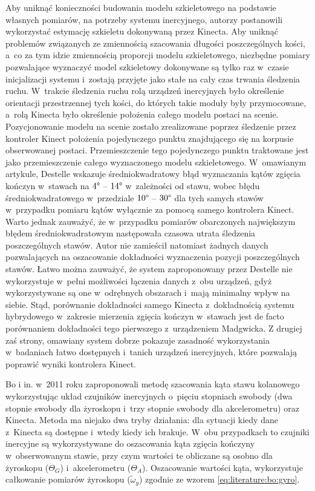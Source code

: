 Aby uniknąć konieczności budowania modelu szkieletowego na podstawie własnych pomiarów, na potrzeby systemu inercyjnego, autorzy postanowili wykorzystać estymację szkieletu dokonywaną przez Kinecta. Aby uniknąć problemów związanych ze zmiennością szacowania długości poszczególnych kości, a~co za tym idzie zmiennością proporcji modelu szkieletowego, niezbędne pomiary pozwalające wyznaczyć model szkieletowy dokonywane są tylko raz w~czasie inicjalizacji systemu i~zostają przyjęte jako stałe na cały czas trwania śledzenia ruchu. W~trakcie śledzenia ruchu rolą urządzeń inercyjnych było określenie orientacji przestrzennej tych kości, do których takie moduły były przymocowane, a~rolą Kinecta było określenie położenia całego modelu postaci na scenie. Pozycjonowanie modelu na scenie zostało zrealizowane poprzez śledzenie przez kontroler Kinect położenia pojedynczego punktu znajdującego się na korpusie obserwowanej postaci. Przemieszczenie tego pojedynczego punktu traktowane jest jako przemieszczenie całego wyznaczonego modelu szkieletowego. W~omawianym artykule, Destelle wskazuje średniokwadratowy błąd wyznaczania kątów zgięcia kończyn w~stawach na $4\degree$ -- $14\degree$ w~zależności od stawu, wobec błędu średniokwadratowego w~przedziale $10\degree$ -- $30\degree$ dla tych samych stawów w~przypadku pomiaru kątów wyłącznie za pomocą samego kontrolera Kinect. Warto jednak zauważyć, że w~przypadku pomiarów obarczonych największym błędem średniokwadratowym następowała czasowa utrata śledzenia poszczególnych stawów. Autor nie zamieścił natomiast żadnych danych pozwalających na oszacowanie dokładności wyznaczenia pozycji poszczególnych stawów. Łatwo można zauważyć, że system zaproponowany przez Destelle nie wykorzystuje w~pełni możliwości łączenia danych z~obu urządzeń, gdyż wykorzystywane są one w~odrębnych obszarach i~mają minimalny wpływ na siebie. Stąd, porównanie dokładności samego Kinecta z~dokładnością systemu hybrydowego w~zakresie mierzenia zgięcia kończyn w~stawach jest de facto porównaniem dokładności tego pierwszego z~urządzeniem Madgwicka. Z drugiej zaś strony, omawiany system dobrze pokazuje zasadność wykorzystania w~badaniach łatwo dostępnych i~tanich urządzeń inercyjnych, które pozwalają poprawić wyniki kontrolera Kinect.	
								
Bo i in. \cite{Bo2011a} w~2011 roku zaproponowali metodę szacowania kąta stawu kolanowego wykorzystując układ czujników inercyjnych o~pięciu stopniach swobody (dwa stopnie swobody dla żyroskopu i~trzy stopnie swobody dla akcelerometru) oraz Kinecta. Metoda ma niejako dwa tryby działania: dla sytuacji kiedy dane z~Kinecta są dostępne i~wtedy kiedy ich brakuje. W~obu przypadkach to czujniki inercyjne są wykorzystywane do oszacowania kąta zgięcia kończyny w~obserwowanym stawie, przy czym wartości te obliczane są osobno dla żyroskopu ($\Theta_G$) i~akcelerometru ($\Theta_A$). Oszacowanie wartości kąta, wykorzystuje całkowanie pomiarów żyroskopu ($\tilde{\omega}_y$) zgodnie ze wzorem \ref{eq:literature:bo:gyro}.

